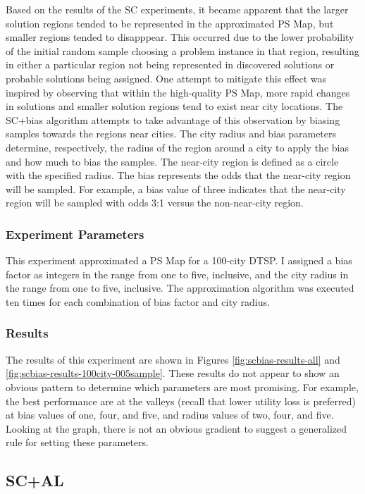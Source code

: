 Based on the results of the SC experiments, it became apparent that the larger solution regions tended to be represented in the approximated PS Map, but smaller regions tended to disapppear.  This occurred due to the lower probability of the initial random sample choosing a problem instance in that region, resulting in either a particular region not being represented in discovered solutions or probable solutions being assigned.  One attempt to mitigate this effect was inspired by observing that within the high-quality PS Map, more rapid changes in solutions and smaller solution regions tend to exist near city locations.  The SC+bias algorithm attempts to take advantage of this observation by biasing samples towards the regions near cities.  The city radius and bias parameters determine, respectively, the radius of the region around a city to apply the bias and how much to bias the samples.  The near-city region is defined as a circle with the specified radius.  The bias represents the odds that the near-city region will be sampled.  For example, a bias value of three indicates that the near-city region will be sampled with odds 3:1 versus the non-near-city region.  

\subsubsection{Experiment Parameters} This experiment approximated a PS Map for a 100-city DTSP.  I assigned a bias factor as integers in the range from one to five, inclusive, and the city radius in the range from one to five, inclusive. The approximation algorithm was executed ten times for each combination of bias factor and city radius.

\subsubsection{Results} The results of this experiment are shown in Figures \ref{fig:scbias-results-all} and \ref{fig:scbias-results-100city-005sample}.  These results do not appear to show an obvious pattern to determine which parameters are most promising.  For example, the best performance are at the valleys (recall that lower utility loss is preferred)  at bias values of one, four, and five, and radius values of two, four, and five.  Looking at the graph, there is not an obvious gradient to suggest a generalized rule for setting these parameters.


\subsection{SC+AL} 


